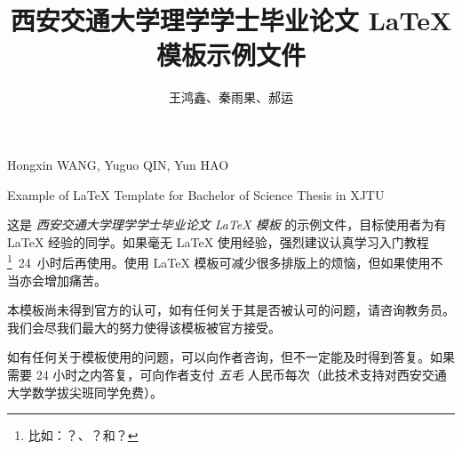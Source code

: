 \documentclass[%
               print, 
              ]{xjtubsc}
\begin{document}

\author{王鸿鑫、秦雨果、郝运}{Hongxin WANG, Yuguo QIN, Yun HAO}	%
\title{西安交通大学理学学士毕业论文 \LaTeX{} 模板示例文件}{Example of \LaTeX{} Template for Bachelor of Science Thesis in XJTU}	%


\begin{INFObackground} %


\end{INFObackground}

\begin{INFOdata} %


\end{INFOdata}

\begin{INFOtask} %


\end{INFOtask}

\begin{INFOrequirement} %


\end{INFOrequirement}

\begin{INFOsubmit} %


\end{INFOsubmit}

\begin{INFOreference} %


\end{INFOreference}

\frontmatter

\extrapages %

\begin{abstractcn} %
这是 \emph{西安交通大学理学学士毕业论文 \LaTeX{} 模板} 的示例文件，目标使用者为有 \LaTeX{} 经验的同学。如果毫无 \LaTeX{} 使用经验，强烈建议认真学习入门教程\footnote{比如：？、？和？}~24~小时后再使用。使用 LaTeX 模板可减少很多排版上的烦恼，但如果使用不当亦会增加痛苦。

本模板尚未得到官方的认可，如有任何关于其是否被认可的问题，请咨询教务员。我们会尽我们最大的努力使得该模板被官方接受。

如有任何关于模板使用的问题，可以向作者咨询，但不一定能及时得到答复。如果需要 24 小时之内答复，可向作者支付 \emph{五毛} 人民币每次（此技术支持对西安交通大学数学拔尖班同学免费）。

\end{abstractcn}
\end{document}
